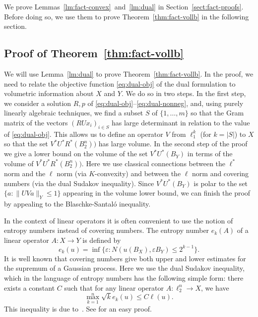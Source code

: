 \documentclass[11pt]{article}
\begin{document}
We prove Lemmas~\ref{lm:fact-convex}~and~\ref{lm:dual} in
Section~\ref{sect:fact-proofs}. Before doing so, we use them to prove
Theorem~\ref{thm:fact-vollb} in the following section. 

\subsection{Proof of Theorem~\ref{thm:fact-vollb}}
\label{sect:fact-pf}

We will use Lemma~\ref{lm:dual} to prove Theorem~\ref{thm:fact-vollb}.
In the proof, we need to relate the objective function
\eqref{eq:dual-obj} of the dual formulation to volumetric information
about $X$ and $Y$. We do so in two steps. In the first step, we
consider a solution $R, p$ of
\eqref{eq:dual-obj}--\eqref{eq:dual-nonneg}, and, using purely
linearly algebraic techniques, we find a subset $S$ of $\{1, \ldots,
m\}$ so that the Gram matrix of the vectors $(RUx_i)_{i \in S}$ has large
determinant  in relation to the value of
\eqref{eq:dual-obj}. This allows us to define an operator $V$ from
$\ell_1^k$ (for  $k = |S|$) to $X$ so that the set
$V^*U^*R^*(B_2^n))$ has large volume. In the second step of the proof
we give a lower bound on the volume of the set $V^*U^*(B_Y)$ in terms
of the volume of $V^*U^*R^*(B_2^n))$. Here we use classical
connections between the $\ell^*$ norm and the $\ell$ norm (via
$K$-convexity) and between the $\ell$ norm and covering numbers (via
the dual Sudakov inequality). Since $V^*U^*(B_Y)$ is polar to the set
$\{a: \|UVa\|_Y \le 1\}$ appearing in the volume lower bound, we can
finish the proof by appealing to the Blaschke-Santal\'o inequality.


In the context of linear operators it is often convenient to use the
notion of entropy numbers instead of covering numbers.  The entropy
number $e_k(A)$ of a linear operator $A:X \to Y$ is defined by
\[
e_k(u) = \inf\{\varepsilon: N(u(B_X), \varepsilon B_Y) \le 2^{k-1}\}. 
\]
It is well known that covering numbers give both upper and lower
estimates for the supremum of a Gaussian process. Here we use the dual
Sudakov inequality, which in the language of entropy numbers has the
following simple form: there exists a constant $C$ such that for any
linear operator $A:\ell_2^n \to X$, we have
\begin{equation}
  \label{eq:sudakov}
  \max_{k = 1}^n \sqrt{k}e_k(u) \le C\ell(u). 
\end{equation}
This inequality is due to~\cite{PTJ85}. See \cite[Section
3.3]{LT91-book} for an easy proof. 
\end{document}
